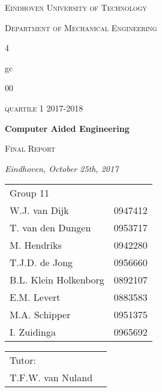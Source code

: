 
\begin{titlepage}
	\centering
	\vspace*{2cm}
	{\scshape\Large Eindhoven University of Technology \par}
	\vspace{.5cm}
	{\scshape\large Department of Mechanical Engineering\\ \begin{small}4\end{small}gc\begin{small}00\end{small}\par}
	{\scshape\large quartile 1 2017-2018\par}
	\vspace{2.5cm}
	{\LARGE\bfseries Computer Aided Engineering \par}
    \vspace{0.3cm}
    {\scshape \large Final Report}\\
	\vspace{.25cm}
	{\large\itshape Eindhoven, October 25th, 2017 \par}
	\vfill
	
\begin{flushleft}
	\begin{tabular}{ll}
	\\		Group 11\\
     W.J. van Dijk & 0947412 \\
     T. van den Dungen & 0953717 \\ M. Hendriks & 0942280 \\ T.J.D. de Jong & 0956660 \\ B.L. Klein Holkenborg & 0892107\\E.M. Levert & 0883583 \\ M.A. Schipper & 0951375 \\ I. Zuidinga & 0965692 \\
 	\end{tabular}
    
    \begin{tabular}{ll}
    \\		Tutor:\\
    T.F.W. van Nuland
    \end{tabular}
	\vspace{1.5cm}
\end{flushleft} 
		
\end{titlepage}